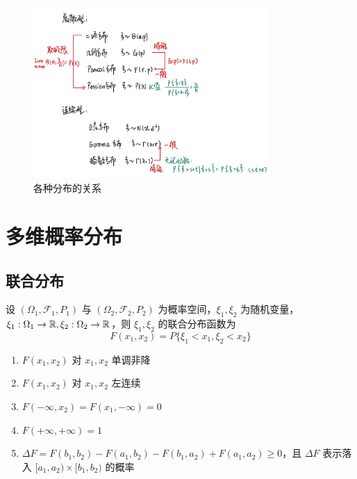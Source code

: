 \documentclass[12pt,a4paper]{amsart}
\begin{document}
\begin{figure}[htbp]
    \centering
    \includegraphics[width=0.8\textwidth]{./src/1.png}
    \caption{各种分布的关系}
    \label{fig:1}
\end{figure}

\section{多维概率分布}

\subsection{联合分布}

\begin{definition}[联合分布函数]
    设 $(\Omega_1, \mathcal{F}_1, P_1)$ 与 $(\Omega_2, \mathcal{F}_2, P_2)$ 为概率空间，$\xi_1, \xi_2$ 为随机变量，$\xi_1: \Omega_1\to\mathbb{R}, \xi_2: \Omega_2\to\mathbb{R}$，则 $\xi_1, \xi_2$ 的联合分布函数为
    \begin{equation}
        F(x_1, x_2) = P\{\xi_1 < x_1, \xi_2 < x_2\}
    \end{equation}
\end{definition}

\begin{proposition}[联合分布函数的性质]
    \begin{enumerate}
        \item $F(x_1, x_2)$ 对 $x_1, x_2$ 单调非降
        \item $F(x_1, x_2)$ 对 $x_1, x_2$ 左连续
        \item $F(-\infty, x_2) = F(x_1, -\infty) = 0$
        \item $F(+\infty, +\infty) = 1$
        \item $\Delta F = F(b_1, b_2) - F(a_1, b_2) - F(b_1, a_2) + F(a_1, a_2) \geq 0$，且 $\Delta F$ 表示落入 $[a_1, a_2)\times[b_1, b_2)$ 的概率
    \end{enumerate}
\end{proposition}
\end{document}
